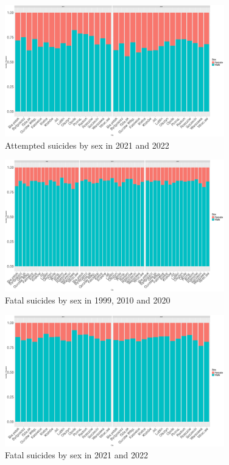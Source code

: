 \documentclass{article}
\begin{document}
\begin{figure}[H]
    \centering
    \includegraphics[width=0.85\textwidth]{imgs/sex_city_att_suicides-2122.pdf}
    \caption{Attempted suicides by sex  in 2021 and 2022}
    \label{fig:sex_city_att_suicides-2122}
\end{figure}

\begin{figure}[H]
    \centering
    \includegraphics[width=0.85\textwidth]{imgs/sex_city_fat_suicides-991020.pdf}
    \caption{Fatal suicides by sex  in 1999, 2010 and 2020}
    \label{fig:sex_city_fat_suicides-991020}
\end{figure}

\begin{figure}[H]
    \centering
    \includegraphics[width=0.85\textwidth]{imgs/sex_city_fat_suicides-2122.pdf}
    \caption{Fatal suicides by sex  in 2021 and 2022}
    \label{fig:sex_city_fat_suicides-2122}
\end{figure}
\end{document}
